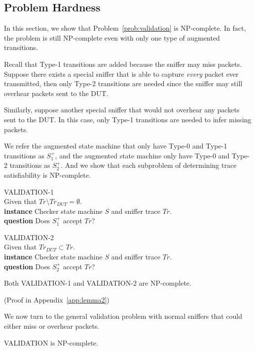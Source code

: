 \subsection{Problem Hardness}
\label{subsec:hard}

In this section, we show that Problem~\ref{prob:validation} is NP-complete.  In
fact, the problem is still NP-complete even with only one type of augmented
transitions.

Recall that Type-1 transitions are added because the sniffer may miss packets.
Suppose there exists a special sniffer that is able to capture \textit{every}
packet ever transmitted, then only Type-2 transitions are needed since the
sniffer may still overhear packets sent to the DUT.

Similarly, suppose another special sniffer that would not overhear any packets
sent to the DUT. In this case, only Type-1 transitions are needed to infer
missing packets.

We refer the augmented state machine that only have Type-0 and Type-1
transitions as $S^+_1$, and the augmented state machine only have Type-0 and
Type-2 transitions as $S^+_2$. And we show that each subproblem of determining
trace satisfiability is NP-complete.

\begin{problem}
  VALIDATION-1\\
  Given that $Tr\setminus Tr_{DUT}=\emptyset$.\\
  \textbf{instance} Checker state machine $S$ and sniffer trace $Tr$.\\
  \textbf{question} Does $S^+_1$ accept $Tr$?
\end{problem}

\begin{problem}
  VALIDATION-2\\
  Given that $Tr_{DUT} \subset Tr$.\\
  \textbf{instance} Checker state machine $S$ and sniffer trace $Tr$.\\
  \textbf{question} Does $S^+_2$ accept $Tr$?
\end{problem}

\begin{lemma}
  Both VALIDATION-1 and VALIDATION-2 are NP-complete.
\end{lemma}%
(Proof in Appendix~\ref{app:lemma2})


We now turn to the general validation problem with normal sniffers that could
either miss or overhear packets.

\begin{theorem}
  VALIDATION is NP-complete.
\end{theorem}
